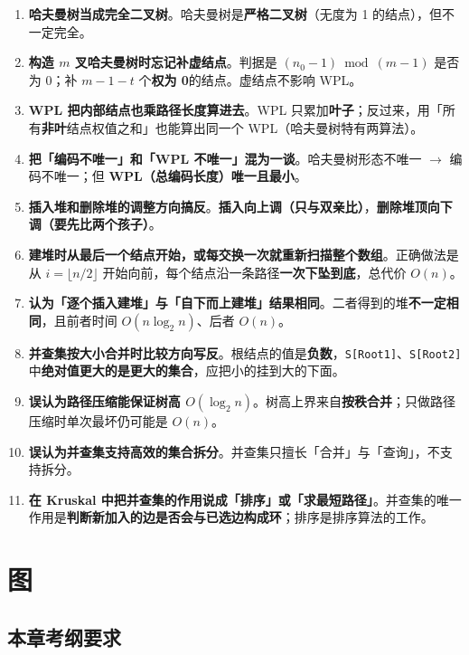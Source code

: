 \documentclass[11pt,openany,UTF8]{ctexbook}
\begin{document}
\begin{enumerate}
\item \textbf{哈夫曼树当成完全二叉树}。哈夫曼树是\textbf{严格二叉树}（无度为 1 的结点），但不一定完全。
\item \textbf{构造 $m$ 叉哈夫曼树时忘记补虚结点}。判据是 $(n_0-1)\bmod(m-1)$ 是否为 0；补 $m-1-t$ 个\textbf{权为 0}的结点。虚结点不影响 WPL。
\item \textbf{WPL 把内部结点也乘路径长度算进去}。WPL 只累加\textbf{叶子}；反过来，用「所有\textbf{非叶}结点权值之和」也能算出同一个 WPL（哈夫曼树特有两算法）。
\item \textbf{把「编码不唯一」和「WPL 不唯一」混为一谈}。哈夫曼树形态不唯一 $\to$ 编码不唯一；但 \textbf{WPL（总编码长度）唯一且最小}。
\item \textbf{插入堆和删除堆的调整方向搞反}。\textbf{插入向上调（只与双亲比）}，\textbf{删除堆顶向下调（要先比两个孩子）}。
\item \textbf{建堆时从最后一个结点开始，或每交换一次就重新扫描整个数组}。正确做法是从 $i=\lfloor n/2\rfloor$ 开始向前，每个结点沿一条路径\textbf{一次下坠到底}，总代价 $O(n)$。
\item \textbf{认为「逐个插入建堆」与「自下而上建堆」结果相同}。二者得到的堆\textbf{不一定相同}，且前者时间 $O(n\log_2 n)$、后者 $O(n)$。
\item \textbf{并查集按大小合并时比较方向写反}。根结点的值是\textbf{负数}，\texttt{S[Root1]\allowbreak{}}、\texttt{S[Root2]\allowbreak{}} 中\textbf{绝对值更大的是更大的集合}，应把小的挂到大的下面。
\item \textbf{误认为路径压缩能保证树高 $O(\log_2 n)$}。树高上界来自\textbf{按秩合并}；只做路径压缩时单次最坏仍可能是 $O(n)$。
\item \textbf{误认为并查集支持高效的集合拆分}。并查集只擅长「合并」与「查询」，不支持拆分。
\item \textbf{在 Kruskal 中把并查集的作用说成「排序」或「求最短路径」}。并查集的唯一作用是\textbf{判断新加入的边是否会与已选边构成环}；排序是排序算法的工作。
\end{enumerate}
\chapter{图}
\section*{本章考纲要求}
\end{document}
